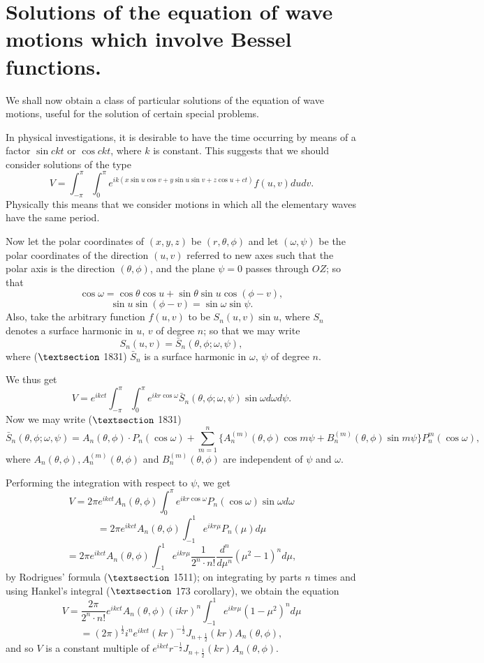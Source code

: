 \documentclass{article}
\begin{document}
\section{Solutions of the equation of wave motions which involve Bessel
functions.}

We shall now obtain a class of particular solutions of the equation of wave
motions, useful for the solution of certain special problems.

In physical investigations, it is desirable to have the time occurring by
means of a factor $\sin ckt$ or $\cos ckt$, where $k$ is constant. This
suggests that we should consider solutions of the type
\[ V = \int_{- \pi}^{\pi} \int_0^{\pi} e^{ik (x \sin u \cos v + y \sin u \sin
   v + z \cos u + ct)} f (u, v) dudv. \]
Physically this means that we consider motions in which all the elementary
waves have the same period.

Now let the polar coordinates of $(x, y, z)$ be $(r, \theta, \phi)$ and let
$(\omega, \psi)$ be the polar coordinates of the direction $(u, v)$ referred
to new axes such that the polar axis is the direction $(\theta, \phi)$, and
the plane $\psi = 0$ passes through $OZ$; so that
\[ \cos \omega = \cos \theta \cos u + \sin \theta \sin u \cos (\phi - v), \]
\[ \sin u \sin (\phi - v) = \sin \omega \sin \psi . \]
Also, take the arbitrary function $f (u, v)$ to be $S_n (u, v) \sin u$, where
$S_n$ denotes a surface harmonic in $u$, $v$ of degree $n$; so that we may
write
\[ S_n (u, v) = \bar{S}_n (\theta, \phi ; \omega, \psi), \]
where (${\textsection}$ 18{\centerdot}31) $\bar{S}_n$ is a surface harmonic in
$\omega$, $\psi$ of degree $n$.

We thus get
\[ V = e^{ikct}  \int_{- \pi}^{\pi} \int_0^{\pi} e^{ikr \cos \omega} 
   \bar{S}_n (\theta, \phi ; \omega, \psi) \sin \omega d \omega d \psi . \]
Now we may write (${\textsection}$ 18{\centerdot}31)
\[ \bar{S}_n (\theta, \phi ; \omega, \psi) = A_n (\theta, \phi) \cdot P_n
   (\cos \omega) + \sum_{m = 1}^n \{A_n^{(m)} (\theta, \phi) \cos m \psi +
   B_n^{(m)} (\theta, \phi) \sin m \psi\} P_n^m (\cos \omega), \]
where $A_n (\theta, \phi), A_n^{(m)} (\theta, \phi)$ and $B_n^{(m)} (\theta,
\phi)$ are independent of $\psi$ and $\omega$.

Performing the integration with respect to $\psi$, we get
\[ V = 2 \pi e^{ikct} A_n (\theta, \phi)  \int_0^{\pi} e^{ikr \cos \omega} P_n
   (\cos \omega) \sin \omega d \omega \]
\[ = 2 \pi e^{ikct} A_n (\theta, \phi)  \int_{- 1}^1 e^{ikr \mu} P_n (\mu) d
   \mu \]
\[ = 2 \pi e^{ikct} A_n (\theta, \phi)  \int_{- 1}^1 e^{ikr \mu}  \frac{1}{2^n
   \cdot n!}  \frac{d^n}{d \mu^n}  (\mu^2 - 1)^n d \mu, \]
by Rodrigues' formula (${\textsection}$ 15{\centerdot}11); on integrating by
parts $n$ times and using Hankel's integral (${\textsection}$ 17{\centerdot}3
corollary), we obtain the equation
\[ V = \frac{2 \pi}{2^n \cdot n!} e^{ikct} A_n (\theta, \phi)  (ikr)^n 
   \int_{- 1}^1 e^{ikr \mu}  (1 - \mu^2)^n d \mu \]
\[ = (2 \pi)^{\frac{1}{2}} i^n e^{ikct}  (kr)^{- \frac{1}{2}} J_{n +
   \frac{1}{2}}  (kr) A_n (\theta, \phi), \]
and so $V$ is a constant multiple of $e^{ikct} r^{- \frac{1}{2}} J_{n +
\frac{1}{2}}  (kr) A_n (\theta, \phi)$.
\end{document}
